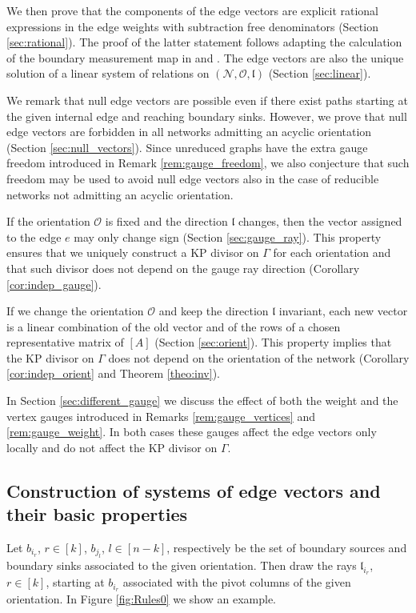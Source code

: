 \documentclass[11pt]{amsart}
\theoremstyle{plain}
\numberwithin{equation}{section}
\begin{document}
We then prove that the components of the edge vectors are explicit rational expressions in the edge weights with subtraction free denominators (Section \ref{sec:rational}). The proof of the latter statement follows adapting the calculation of the boundary measurement map in \cite{Pos} and \cite{Tal2}. The edge vectors are also the unique solution of a linear system of relations on $({\mathcal N},\mathcal O, \mathfrak l)$ (Section \ref{sec:linear}).

We remark that null edge vectors are possible even if there exist paths starting at the given internal edge and reaching boundary sinks. However, we prove that null edge vectors are forbidden in all networks admitting an acyclic orientation 
(Section \ref{sec:null_vectors}). Since unreduced graphs have the extra gauge freedom introduced in Remark \ref{rem:gauge_freedom}, we also conjecture that such freedom may be used to avoid null edge vectors also
in the case of reducible networks not admitting an acyclic orientation. 

If the orientation $\mathcal O$ is fixed and the direction $\mathfrak l$ changes, then the vector assigned to the edge $e$ may only change sign (Section \ref{sec:gauge_ray}). 
This property ensures that we uniquely construct a KP divisor on $\Gamma$ for each orientation and that such divisor does not depend on the gauge ray direction (Corollary \ref{cor:indep_gauge}).

If we change the orientation $\mathcal O$ and keep the direction $\mathfrak l$ invariant, each new vector is a linear combination of the old vector and of the rows of a chosen representative matrix of $[A]$ (Section \ref{sec:orient}).
This property implies that the KP divisor on $\Gamma$ does not depend on the orientation of the network (Corollary \ref{cor:indep_orient} and Theorem \ref{theo:inv}). 

In Section \ref{sec:different_gauge} we discuss the effect of both the weight and the vertex gauges introduced in Remarks \ref{rem:gauge_vertices} and \ref{rem:gauge_weight}. In both cases these gauges affect the edge vectors only locally and do not affect the KP divisor on $\Gamma$.

\subsection{Construction of systems of edge vectors and their basic properties}\label{sec:def_edge_vectors}
Let $b_{i_r}$, $r\in[k]$, $b_{j_l}$, $l\in[n-k]$, respectively  be the set of boundary sources and boundary sinks 
associated to the given orientation. Then draw the rays ${\mathfrak l}_{i_r}$, $r\in[k]$, starting at $b_{i_r}$ associated with the pivot columns of the given orientation. In Figure \ref{fig:Rules0} we show an example.
\end{document}
